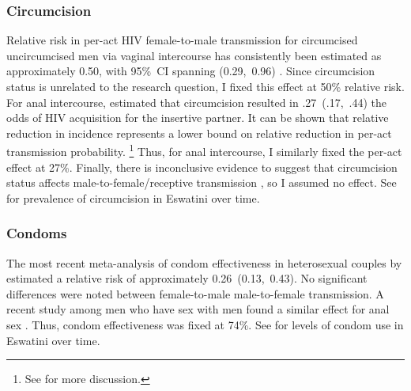 \subsubsection{Circumcision}\label{model.par.beta.circ}
Relative risk in per-act HIV female-to-male transmission for circumcised \vs uncircumcised men
via vaginal intercourse has consistently been estimated as
approximately 0.50, with 95\%~CI spanning (0.29,~0.96) \cite{Boily2009,Hughes2012,Patel2014}.
Since circumcision status is unrelated to the research question,
I fixed this effect at 50\% relative risk.
For anal intercourse, \citet{Wiysonge2011} estimated that circumcision resulted in
.27~(.17,~.44) the odds of HIV acquisition for the insertive partner.
It can be shown that relative reduction in incidence represents a lower bound
on relative reduction in per-act transmission probability.%
\footnote{See  for more discussion.}
Thus, for anal intercourse, I similarly fixed the per-act effect at 27\%.
Finally, there is inconclusive evidence to suggest that circumcision status affects
male-to-female/receptive transmission \cite{Weiss2009,Wiysonge2011}, so I assumed no effect.
See  for prevalence of circumcision in Eswatini over time.
\subsubsection{Condoms}\label{model.par.beta.condom}
The most recent meta-analysis of condom effectiveness in heterosexual couples by \citet{Giannou2016}
estimated a relative risk of approximately 0.26~(0.13,~0.43).
No significant differences were noted between female-to-male \vs male-to-female transmission.
A recent study among men who have sex with men found
a similar effect for anal sex \cite{Smith2015}.
Thus, condom effectiveness was fixed at 74\%.
See  for levels of condom use in Eswatini over time.
